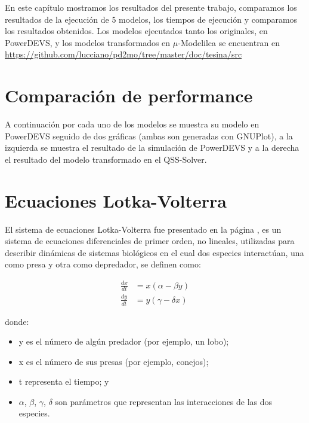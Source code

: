 	En este capítulo mostramos los resultados del presente trabajo, comparamos los resultados de la ejecución de 5 modelos, los tiempos de ejecución y 
		comparamos los resultados obtenidos. Los modelos ejecutados tanto los originales, en PowerDEVS, y los modelos transformados en 
		$\mu$-Modelilca se encuentran en \url{https://github.com/lucciano/pd2mo/tree/master/doc/tesina/src}

\section{Comparación de performance}
	A continuación por cada uno de los modelos se muestra su modelo en PowerDEVS seguido de dos gráficas (ambas son generadas con GNUPlot), 
	a la izquierda se muestra el resultado de la simulación de PowerDEVS y a la derecha el resultado del modelo transformado en el QSS-Solver.


\section{Ecuaciones Lotka-Volterra}

	El sistema de ecuaciones Lotka-Volterra fue presentado en la página \pageref{lotka_volterra_ref}, es un sistema de ecuaciones diferenciales de primer orden, no lineales, utilizadas para describir dinámicas de sistemas biológicos en el cual dos especies interactúan, una como presa y otra como depredador, se definen como:

\begin{align*}
\frac{dx}{dt} & = x(\alpha - \beta y)\\
\frac{dy}{dt} & =y(\gamma - \delta  x)
\end{align*}

donde:
\begin{itemize}
	\item y es el número de algún predador (por ejemplo, un lobo);
    \item x es el número de sus presas (por ejemplo, conejos);
    \item t representa el tiempo; y
    \item $\alpha$, $\beta$, $\gamma$, $\delta$ son parámetros que representan las interacciones de las dos especies.
\end{itemize}

